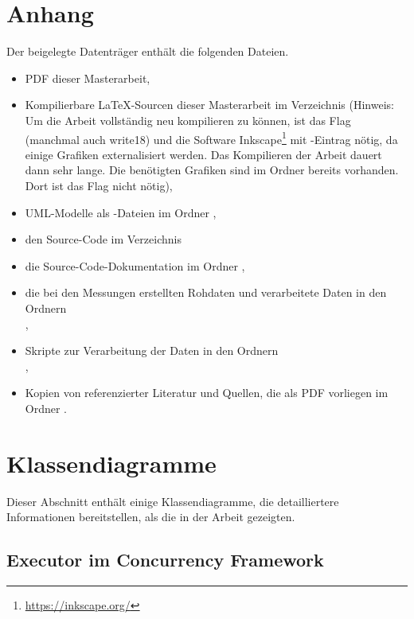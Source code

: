 \appendix
\clearpage
\renewcommand{\sectionmark}[1]{\markboth{\Ifnumbered{section}{Anhang \thesection}{}}{#1}}
\setcounter{page}{1}

\section*{Anhang}
{}

Der beigelegte Datenträger enthält die folgenden Dateien.

\begin{itemize}
	\item PDF dieser Masterarbeit,
	\item Kompilierbare \LaTeX-Sourcen dieser Masterarbeit im Verzeichnis  (Hinweis: Um die Arbeit vollständig neu kompilieren zu können, ist das Flag  (manchmal auch write18) und die Software Inkscape\footnote{\url{https://inkscape.org/}} mit -Eintrag nötig, da einige Grafiken externalisiert werden. Das Kompilieren der Arbeit dauert dann sehr lange. Die benötigten Grafiken sind im Ordner  bereits vorhanden. Dort ist das Flag nicht nötig),
	\item UML-Modelle als -Dateien im Ordner ,
	\item den Source-Code im Verzeichnis 
	\item die Source-Code-Dokumentation im Ordner ,
	\item die bei den Messungen erstellten Rohdaten und verarbeitete Daten in den Ordnern\\ ,
	\item Skripte zur Verarbeitung der Daten in den Ordnern\\ ,
	\item Kopien von referenzierter Literatur und Quellen, die als PDF vorliegen im Ordner .
\end{itemize}

\clearpage
\section{Klassendiagramme}
Dieser Abschnitt enthält einige Klassendiagramme, die detailliertere Informationen bereitstellen, als die in der Arbeit gezeigten.
\subsection{Executor im Concurrency Framework}\label{appendix:concFrameworkExecutor}



